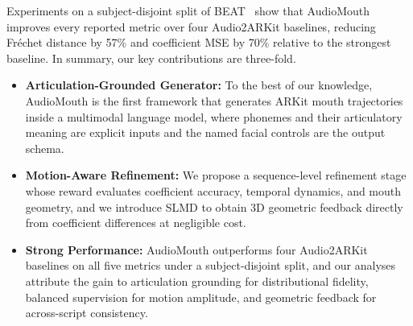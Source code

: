 Experiments on a subject-disjoint split of BEAT~\citep{liu2022beat} show that AudioMouth improves every reported metric over four Audio2ARKit baselines, reducing Fr\'echet distance by 57\% and coefficient MSE by 70\% relative to the strongest baseline. In summary, our key contributions are three-fold.
\begin{itemize}[leftmargin=1em, itemsep=-1ex, topsep=0ex]
    \item \textbf{Articulation-Grounded Generator:} To the best of our knowledge, AudioMouth is the first framework that generates ARKit mouth trajectories inside a multimodal language model, where phonemes and their articulatory meaning are explicit inputs and the named facial controls are the output schema.
    \item \textbf{Motion-Aware Refinement:} We propose a sequence-level refinement stage whose reward evaluates coefficient accuracy, temporal dynamics, and mouth geometry, and we introduce SLMD to obtain 3D geometric feedback directly from coefficient differences at negligible cost.
    \item \textbf{Strong Performance:} AudioMouth outperforms four Audio2ARKit baselines on all five metrics under a subject-disjoint split, and our analyses attribute the gain to articulation grounding for distributional fidelity, balanced supervision for motion amplitude, and geometric feedback for across-script consistency.
\end{itemize}
